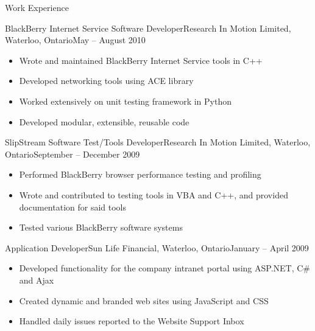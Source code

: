 \documentclass[11pt]{article}
\begin{document}
	\begin{section}{Work Experience} \\

        \begin{subsection}{BlackBerry Internet Service Software Developer}{Research In Motion Limited, Waterloo, Ontario}{May -- August 2010}

            \begin{itemize}
                \item Wrote and maintained BlackBerry Internet Service tools in C++
                \item Developed networking tools using ACE library
                \item Worked extensively on unit testing framework in Python
                \item Developed modular, extensible, reusable code
            \end{itemize}

        \end{subsection}
	
		\begin{subsection}{SlipStream Software Test/Tools Developer}{Research In Motion Limited, Waterloo, Ontario}{September -- December 2009}
		
			\begin{itemize}
				\item Performed BlackBerry browser performance testing and profiling
				\item Wrote and contributed to testing tools in VBA and C++, and provided documentation for said tools
				\item Tested various BlackBerry software systems 
			\end{itemize}
			
		\end{subsection}
			
		\begin{subsection}{Application Developer}{Sun Life Financial, Waterloo, Ontario}{January -- April 2009}
		
			\begin{itemize}
				\item Developed functionality for the company intranet portal using ASP.NET, C\# and Ajax
				\item Created dynamic and branded web sites using JavaScript and CSS
				\item Handled daily issues reported to the Website Support Inbox
			\end{itemize}
			

\end{subsection}
\end{section}
\end{document}
